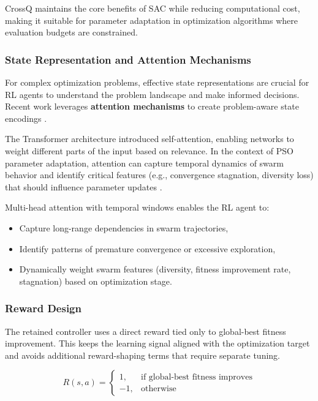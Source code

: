 CrossQ maintains the core benefits of SAC while reducing computational cost, making it suitable for parameter adaptation in optimization algorithms where evaluation budgets are constrained.

\subsubsection*{State Representation and Attention Mechanisms}

For complex optimization problems, effective state representations are crucial for RL agents to understand the problem landscape and make informed decisions. Recent work leverages \textbf{attention mechanisms} to create problem-aware state encodings \cite{Vaswani2017}.

The Transformer architecture \cite{Vaswani2017} introduced self-attention, enabling networks to weight different parts of the input based on relevance. In the context of PSO parameter adaptation, attention can capture temporal dynamics of swarm behavior and identify critical features (e.g., convergence stagnation, diversity loss) that should influence parameter updates \cite{Vaswani2017}.

Multi-head attention with temporal windows enables the RL agent to:
\begin{itemize}
\item Capture long-range dependencies in swarm trajectories,
\item Identify patterns of premature convergence or excessive exploration,
\item Dynamically weight swarm features (diversity, fitness improvement rate, stagnation) based on optimization stage.
\end{itemize}

\subsubsection*{Reward Design}

The retained controller uses a direct reward tied only to global-best fitness improvement. This keeps the learning signal aligned with the optimization target and avoids additional reward-shaping terms that require separate tuning.

\begin{equation}
R(s, a) =
\begin{cases}
1, & \text{if global-best fitness improves} \\
-1, & \text{otherwise}
\end{cases}
\end{equation}

